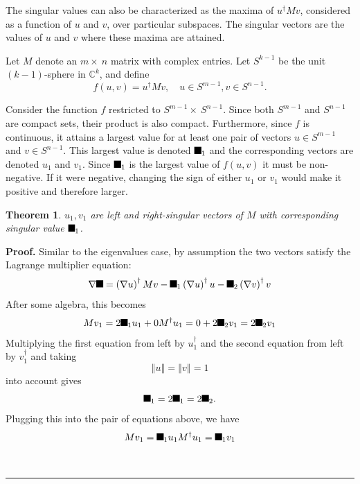 \documentclass[aps,preprint]{revtex4}%
\providecommand{\U}[1]{\protect\rule{.1in}{.1in}}
\newtheorem{theorem}{Theorem}
\newenvironment{proof}[1][Proof]{\noindent\textbf{#1.} }{\ \rule{0.5em}{0.5em}}
\begin{document}
The singular values can also be characterized as the maxima of $u^{\dagger}%
Mv$, considered as a function of $u$ and $v$, over particular subspaces. The
singular vectors are the values of $u$ and $v$ where these maxima are attained.

Let $M$ denote an $m\times\ n$ matrix with complex entries. Let $S^{k-1}$ be
the unit $(k-1)$-sphere in $\mathbb{C}^{k}$, and define
\begin{equation}
f(u,v)=u^{\dagger}Mv,\quad u\in S^{m-1},v\in S^{n-1}.
\end{equation}


Consider the function $f$ restricted to $S^{m-1}\times\ S^{n-1}$. Since both
$S^{m-1}$ and $S^{n-1}$ are compact sets, their product is also compact.
Furthermore, since $f$ is continuous, it attains a largest value for at least
one pair of vectors $u\in S^{m-1}$ and $v\in S^{n-1}$. This largest value is
denoted $\U{3c3} _{1}$ and the corresponding vectors are denoted $u_{1}$ and
$v_{1}$. Since $\U{3c3} _{1}$ is the largest value of $f(u,v)$ it must be
non-negative. If it were negative, changing the sign of either $u_{1}$ or
$v_{1}$ would make it positive and therefore larger.

\begin{theorem}
$u_{1},v_{1}$ are left and right-singular vectors of $M$ with corresponding
singular value $\U{3c3} _{1}$.
\end{theorem}

\begin{proof}
Similar to the eigenvalues case, by assumption the two vectors satisfy the
Lagrange multiplier equation:%
\begin{equation}
\nabla\U{3c3} =\left(  \nabla u\right)  ^{\dagger}Mv-\U{3bb} _{1}\left(
\nabla u\right)  ^{\dagger}u-\U{3bb} _{2}\left(  \nabla v\right)  ^{\dagger}v
\end{equation}
After some algebra, this becomes%
\begin{equation}
Mv_{1}=2\U{3bb} _{1}u_{1}+0M^{\dagger}u_{1}=0+2\U{3bb} _{2}v_{1}=2\U{3bb}
_{2}v_{1}%
\end{equation}
Multiplying the first equation from left by $u_{1}^{\dagger}$ and the second
equation from left by $v_{1}^{\dagger}$ and taking
\begin{equation}
\left\Vert u\right\Vert =\left\Vert v\right\Vert =1
\end{equation}
into account gives%
\begin{equation}
\U{3c3} _{1}=2\U{3bb} _{1}=2\U{3bb} _{2}.
\end{equation}
Plugging this into the pair of equations above, we have%
\begin{equation}
Mv_{1}=\U{3c3} _{1}u_{1}M^{\dagger}u_{1}=\U{3c3} _{1}v_{1}%
\end{equation}

\end{proof}
\end{document}
